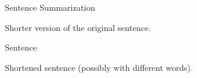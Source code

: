 \documentclass{beamer}
\begin{document}


\begin{frame}{Sentence Summarization}
  \begin{description} \itemsep 20pt
  \item[Goal] Shorter version of the original sentence.
  \item[Input] Sentence
  \item[Output] Shortened sentence (possibly with different words).
  \end{description}  
\end{frame}
\end{document}
